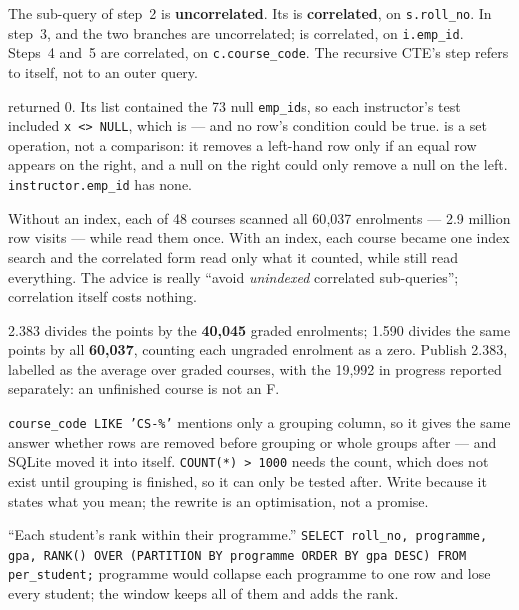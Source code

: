 \begin{ans}
  \item The  sub-query of step~2 is \textbf{uncorrelated}. Its
         is \textbf{correlated}, on \texttt{s.roll\_no}. In
        step~3,  and the two  branches are
        uncorrelated;  is correlated, on \texttt{i.emp\_id}.
        Steps~4 and~5 are correlated, on \texttt{c.course\_code}. The recursive
        CTE's step refers to itself, not to an outer query.
  \item {} returned 0. Its list contained the 73 null
        \texttt{emp\_id}s, so each instructor's test included \texttt{x <>
        NULL}, which is \unk{} --- and no row's condition could be true.
         is a set operation, not a comparison: it removes a
        left-hand row only if an equal row appears on the right, and a null on
        the right could only remove a null on the left. \texttt{instructor.emp\_id}
        has none.
  \item Without an index, each of 48 courses scanned all 60{,}037
        enrolments --- 2.9 million row visits --- while  read
        them once. With an index, each course became one index search and the
        correlated form read only what it counted, while  still
        read everything. The advice is really ``avoid \emph{unindexed}
        correlated sub-queries''; correlation itself costs nothing.
\end{ans}

\begin{ans}
  \item 2.383 divides the points by the \textbf{40{,}045} graded enrolments;
        1.590 divides the same points by all \textbf{60{,}037}, counting each
        ungraded enrolment as a zero. Publish 2.383, labelled as the average
        over graded courses, with the 19{,}992 in progress reported separately:
        an unfinished course is not an F.
  \item \texttt{course\_code LIKE 'CS-\%'} mentions only a grouping column, so
        it gives the same answer whether rows are removed before grouping or
        whole groups after --- and SQLite moved it into  itself.
        \texttt{COUNT(*) > 1000} needs the count, which does not exist until
        grouping is finished, so it can only be tested after. Write
         because it states what you mean; the rewrite is an
        optimisation, not a promise.
  \item ``Each student's rank within their programme.''
        \texttt{SELECT roll\_no, programme, gpa, RANK() OVER (PARTITION BY
        programme ORDER BY gpa DESC) FROM per\_student;} 
        programme would collapse each programme to one row and lose every
        student; the window keeps all of them and adds the rank.
\end{ans}

